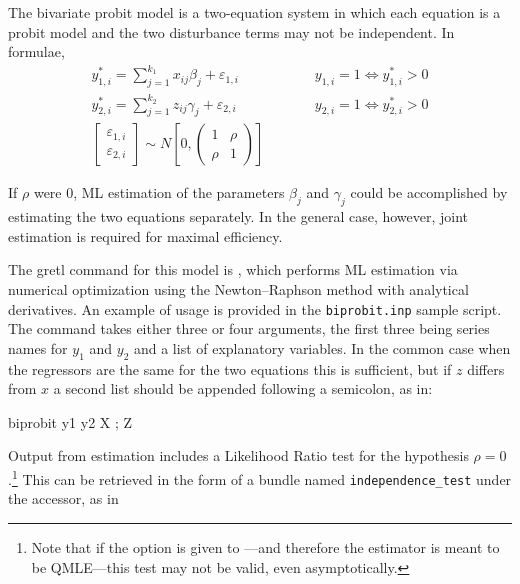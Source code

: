 The bivariate probit model is a two-equation system in which each
equation is a probit model and the two disturbance terms may not be
independent. In formulae,
\begin{eqnarray}
  y^*_{1,i} = \sum_{j=1}^{k_1} x_{ij} \beta_j + \varepsilon_{1,i}  & \qquad &
  y_{1,i}=1  \Longleftrightarrow y^*_{1,i}>0 \\
  y^*_{2,i} = \sum_{j=1}^{k_2} z_{ij} \gamma_j + \varepsilon_{2,i} & \qquad &
  y_{2,i}=1  \Longleftrightarrow y^*_{2,i}>0 \\
  \left[ \begin{array}{c}
      \varepsilon_{1,i} \\ \varepsilon_{2,i}
    \end{array} \right] \sim 
  N \left[ 0, \left( \begin{array}{cc}
      1 & \rho \\ \rho & 1
    \end{array} \right) \right] 
\end{eqnarray}

If $\rho$ were 0, ML estimation of the parameters $\beta_j$ and
$\gamma_j$ could be accomplished by estimating the two equations
separately. In the general case, however, joint estimation is required
for maximal efficiency.

The gretl command for this model is , which performs ML
estimation via numerical optimization using the Newton--Raphson method
with analytical derivatives. An example of usage is provided in the
\texttt{biprobit.inp} sample script.  The command takes either three
or four arguments, the first three being series names for $y_{1}$ and
$y_{2}$ and a list of explanatory variables. In the common case when
the regressors are the same for the two equations this is sufficient,
but if $z$ differs from $x$ a second list should be appended following
a semicolon, as in:
\begin{code}
  biprobit y1 y2 X ; Z
\end{code}
Output from estimation includes a Likelihood Ratio test for the
hypothesis $\rho = 0$.\footnote{Note that if the 
  option is given to ---and therefore the estimator is
  meant to be QMLE---this test may not be valid, even asymptotically.}
This can be retrieved in the form of a bundle named
\texttt{independence\_test} under the  accessor, as in


